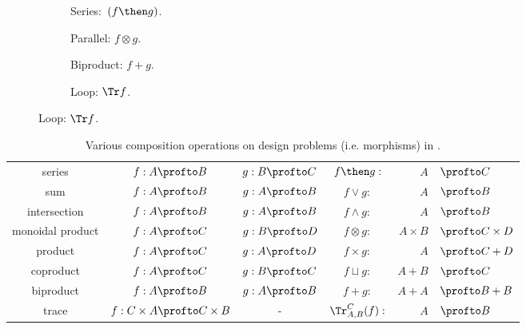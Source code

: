 \begin{figure}[h!]
    \centering
    \begin{subfigure}{0.2\textwidth}
        \centering
        \caption{Series:~$(f \then g)$.}
    \end{subfigure}
    \hspace{10mm} %
    \begin{subfigure}{0.2\textwidth}
        \centering
        \caption{Parallel: $f \otimes g$.}
    \end{subfigure}
    \hspace{10mm} %
    \begin{subfigure}{0.2\textwidth}
        \centering
        \caption{Biproduct: $f + g$.}
    \end{subfigure}
    \hspace{10mm} %
    \begin{subfigure}{0.2\textwidth}
        \centering
        \caption{Loop: $\Tr f$.}
    \end{subfigure}
    \label{fig:diagrams}
\end{figure}

\begin{table}[t!]
    \centering
    \begin{tabular}{c|c|c|crl}
        series &
        $f:A\profto B$ &
        $g:B\profto C$ &
        $f\then g:$ & $A$ & $\profto C$ \\
        sum &
        $f:A\profto B$ &
        $g:A\profto B$ &
        $f\vee g:$ & $A$ & $\profto B$ \\
        intersection &
        $f:A\profto B$ &
        $g:A\profto B$ &
        $f\wedge g:$ & $A$ & $\profto B$ \\
        monoidal product &
        $f:A\profto C$ &
        $g:B\profto D$ &
        $f\otimes g:$ & $A\times B$ & $\profto C \times D$ \\
        product &
        $f:A\profto C$ &
        $g:A\profto D$ &
        $f\times g:$ & $A $ & $\profto C + D$ \\
        coproduct &
        $f:A\profto C$ &
        $g:B\profto C$ &
        $f\sqcup g:$ & $A + B $ & $\profto C$ \\
        biproduct &
        $f:A\profto B$ &
        $g:A\profto B$ &
        $f+ g:$ & $A + A$ & $\profto B + B$ \\
        trace &
        $f: C \times A \profto C \times B$ &
        - &
        $\Tr_{A,B}^C(f) :$ & $A$ & $\profto B$
    \end{tabular}
    \caption{Various composition operations on design problems (i.e. morphisms) in \DP.}
\end{table}
